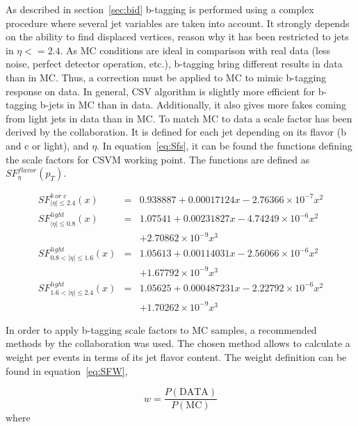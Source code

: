 As described in section~\ref{sec:bid} b-tagging is performed using a complex procedure where several jet variables are taken into account. It strongly depends on the ability to find displaced vertices, reason why it has been restricted to jets in $\eta<=2.4$. As MC conditions are ideal in comparison with real data (less noise, perfect detector operation, etc.), b-tagging bring different results in data than in MC. Thus, a correction must be applied to MC to mimic b-tagging response on data. In general, CSV algorithm is slightly more efficient for b-tagging b-jets in MC than in data. Additionally, it also gives more fakes coming from light jets in data than in MC. To match MC to data a scale factor has been derived by the collaboration. It is defined for each jet depending on its flavor (b and c or light), \pt and $\eta$. In equation~\ref{eq:Sfs}, it can be found the functions defining the scale factors for CSVM working point. The functions are defined as $SF^{flavor}_{\eta}(p_{T})$.

\begin{eqnarray}
  \label{eq:Sfs}
  SF^{b\; or\; c}_{|\eta|\le 2.4}(x) & = & 0.938887 + 0.00017124x - 2.76366 \times 10^{-7}x^{2} \nonumber \\
  SF^{light}_{|\eta|\le 0.8}(x) & = & 1.07541 + 0.00231827x - 4.74249 \times 10^{-6}x^{2}  \nonumber \\
  &  & +2.70862 \times 10^{-9}x^{3} \nonumber \\
  SF^{light}_{0.8 < |\eta|\le 1.6}(x) & = & 1.05613 + 0.00114031x - 2.56066 \times 10^{-6}x^{2} \nonumber \\
  &  & + 1.67792 \times 10^{-9}x^{3} \nonumber \\
  SF^{light}_{1.6 < |\eta|\le 2.4}(x) & = & 1.05625 + 0.000487231x - 2.22792 \times 10^{-6}x^{2} \nonumber \\
  &  & + 1.70262 \times 10^{-9}x^{3}
\end{eqnarray}

In order to apply b-tagging scale factors to MC samples, a recommended methods by the collaboration was used. The chosen method allows to calculate a weight per events in terms of its jet flavor content. The weight definition can be found in equation~\ref{eq:SFW}, 

\begin{equation}
  \label{eq:SFW}
  w=\frac{P(\text{DATA})}{P(\text{MC})}
\end{equation}where

